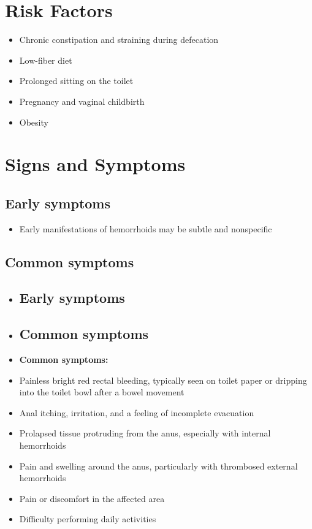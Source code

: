 \section{Risk Factors}

\begin{itemize}[noitemsep]
  \item Chronic constipation and straining during defecation
  \item Low-fiber diet
  \item Prolonged sitting on the toilet
  \item Pregnancy and vaginal childbirth
  \item Obesity
\end{itemize}

\section{Signs and Symptoms}

\subsection{Early symptoms}
\begin{itemize}[noitemsep]
  \item Early manifestations of hemorrhoids may be subtle and nonspecific
\end{itemize}

\subsection{Common symptoms}
\begin{itemize}[noitemsep]
  \item \subsection{Early symptoms}
  \item \subsection{Common symptoms}
  \item \textbf{Common symptoms:}
  \item Painless bright red rectal bleeding, typically seen on toilet paper or dripping into the toilet bowl after a bowel movement
  \item Anal itching, irritation, and a feeling of incomplete evacuation
  \item Prolapsed tissue protruding from the anus, especially with internal hemorrhoids
  \item Pain and swelling around the anus, particularly with thrombosed external hemorrhoids
  \item Pain or discomfort in the affected area
  \item Difficulty performing daily activities
\end{itemize}

